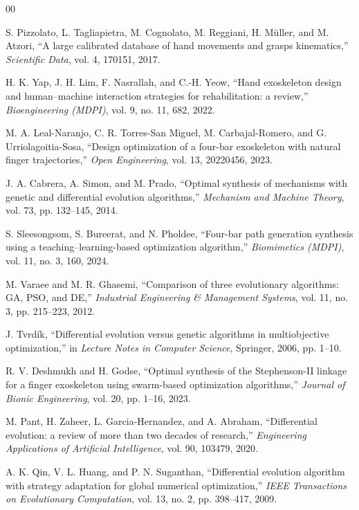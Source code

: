 \begin{thebibliography}{00}

 S. Pizzolato, L. Tagliapietra, M. Cognolato,
M. Reggiani, H. M\"uller, and M. Atzori,
``A large calibrated database of hand movements and grasps kinematics,''
\textit{Scientific Data}, vol. 4, 170151, 2017.

 H. K. Yap, J. H. Lim, F. Nasrallah, and C.-H. Yeow,
``Hand exoskeleton design and human--machine interaction strategies for
rehabilitation: a review,'' \textit{Bioengineering (MDPI)}, vol. 9, no. 11, 682, 2022.

 M. A. Leal-Naranjo, C. R. Torres-San Miguel, M. Carbajal-Romero, and G. Urriolagoitia-Sosa,
``Design optimization of a four-bar exoskeleton with natural finger
trajectories,'' \textit{Open Engineering}, vol. 13, 20220456, 2023.

 J. A. Cabrera, A. Simon, and M. Prado,
``Optimal synthesis of mechanisms with genetic and differential evolution
algorithms,'' \textit{Mechanism and Machine Theory}, vol. 73, pp. 132--145, 2014.

 S. Sleesongsom, S. Bureerat, and N. Pholdee,
``Four-bar path generation synthesis using a teaching--learning-based
optimization algorithm,'' \textit{Biomimetics (MDPI)}, vol. 11, no. 3, 160, 2024.

 M. Varaee and M. R. Ghasemi,
``Comparison of three evolutionary algorithms: GA, PSO, and DE,''
\textit{Industrial Engineering \& Management Systems}, vol. 11, no. 3,
pp. 215--223, 2012.

 J. Tvrd\'ik,
``Differential evolution versus genetic algorithms in multiobjective
optimization,'' in \textit{Lecture Notes in Computer Science}, Springer, 2006,
pp. 1--10.

 R. V. Deshmukh and H. Godse,
``Optimal synthesis of the Stephenson-II linkage for a finger exoskeleton using
swarm-based optimization algorithms,'' \textit{Journal of Bionic Engineering},
vol. 20, pp. 1--16, 2023.

 M. Pant, H. Zaheer, L. Garcia-Hernandez, and A. Abraham,
``Differential evolution: a review of more than two decades of research,''
\textit{Engineering Applications of Artificial Intelligence}, vol. 90, 103479, 2020.

 A. K. Qin, V. L. Huang, and P. N. Suganthan,
``Differential evolution algorithm with strategy adaptation for global numerical
optimization,'' \textit{IEEE Transactions on Evolutionary Computation},
vol. 13, no. 2, pp. 398--417, 2009.


\end{thebibliography}

